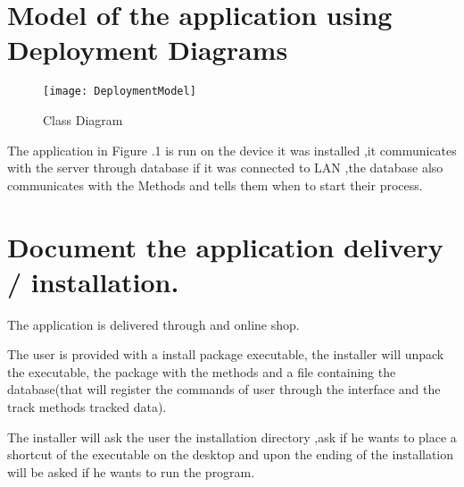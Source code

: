 
\setlength{\parindent}{2ex}
\section{Model of the application using Deployment Diagrams}
\par
\begin{figure}[h!]
	\centering
	\texttt{[image: DeploymentModel]}
	\caption{Class Diagram} 
\end{figure}
The application in Figure \thesection.1 is run on the device it was installed ,it communicates with the server through database if it was connected to LAN ,the database also communicates with the Methods and tells them when to start their process.
\newpage
\section{Document the application delivery / installation.}
The application is delivered through and online shop.\par
The user is provided with a install package executable, the installer will unpack the executable, the package with the methods and a file containing the database(that will register the commands of user through the interface and the track methods tracked data).\par 
The installer will ask the user the installation directory ,ask if he wants to place a shortcut of the executable on the desktop and upon the ending of the installation will be asked if he wants to run the program.

\clearpage
